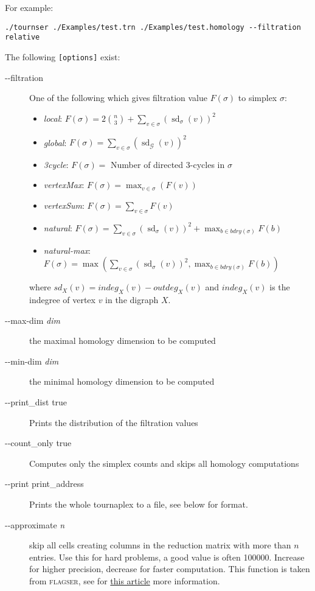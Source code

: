 \documentclass{amsart}
\theoremstyle{definition}
\newcommand{\sd}{\operatorname{\mathrm{sd}}}
\begin{document}
\vspace{1em}

For example:

\vspace{1em}

\begin{verbatim}./tournser ./Examples/test.trn ./Examples/test.homology --filtration relative\end{verbatim}

\vspace{1em}

\noindent
The following \texttt{[options]} exist:

\enlargethispage{\baselineskip}
\begin{description} 
  \item [-{}-filtration] One of the following which gives filtration value $F(\sigma)$ to simplex $\sigma$:
  \begin{itemize}
    \item \emph{local}: $F(\sigma)=2\binom{n}{3}+\sum_{v\in \sigma}(\sd_\sigma(v))^2$
    \item \emph{global}:  $F(\sigma)=\sum_{v\in \sigma}(\sd_\mathcal{G}(v))^2$
    \item \emph{3cycle}: $F(\sigma)=$ Number of directed 3-cycles in $\sigma$
    \item \emph{vertexMax}: $F(\sigma)=\max_{v\in\sigma}(F(v))$
    \item \emph{vertexSum}: $F(\sigma)=\sum_{v\in\sigma}F(v)$
    \item \emph{natural}: $F(\sigma)=\sum_{v\in \sigma}(\sd_\sigma(v))^2+\max_{b\in bdry(\sigma)}F(b)$
    \item \emph{natural-max}: $F(\sigma)=\max(\sum_{v\in \sigma}(\sd_\sigma(v))^2,\max_{b\in bdry(\sigma)}F(b))$
  \end{itemize} 
  where $sd_X(v)=indeg_X(v)-outdeg_X(v)$ and $indeg_X(v)$ is the indegree of vertex $v$ in the digraph $X$.
  \item [-{}-max-dim \textit{dim}] the maximal homology dimension to be computed
  \item [-{}-min-dim \textit{dim}] the minimal homology dimension to be computed
  \item [-{}-print\_dist true] Prints the distribution of the filtration values
  \item [-{}-count\_only true] Computes only the simplex counts and skips all homology computations
  \item [-{}-print print\_address] Prints the whole tournaplex to a file, see below for format.
  \item [-{}-approximate \textit{n}] skip all cells creating columns in the reduction matrix with
    more than $n$ entries. Use this for hard problems, a good value is often 100000. Increase for
    higher precision, decrease for faster computation. This function is taken from \textsc{flagser}, see for \href{https://www.mdpi.com/1999-4893/13/1/19}{this article} more information.
\end{description}
\end{document}
